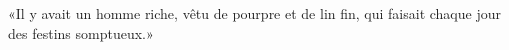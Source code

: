 \encetemps \jesuspharisiens
	«Il y avait un homme riche, vêtu de pourpre et de lin fin,
	qui faisait chaque jour des festins somptueux.»
